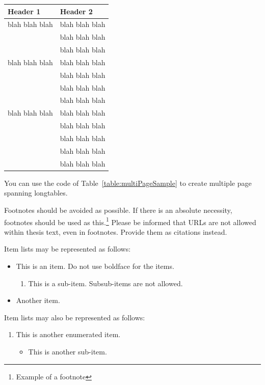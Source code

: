\documentclass[a4paper,oneside,12pt]{report}
\numberwithin{equation}{chapter}
\begin{document}
\begin{center}
\begin{longtable}{|l|l|}
		\pagebreak
		\textbf{Header 1}& \textbf{Header 2}\\\hline
		blah blah blah & blah blah blah \\
		& blah blah blah \\
		& blah blah blah \\\hline
		
		blah blah blah & blah blah blah \\
		& blah blah blah \\
		& blah blah blah \\
		& blah blah blah \\\hline
		
		blah blah blah & blah blah blah \\
		& blah blah blah \\
		& blah blah blah \\
		& blah blah blah \\
		& blah blah blah \\\hline
	\end{longtable}
\end{center}
\vskip -2cm %
\endgroup

You can use the code of Table~\ref{table:multiPageSample} to create multiple page spanning longtables.

Footnotes should be avoided as possible. If there is an absolute
necessity, footnotes should be used as this.\footnote{Example of a
footnote}  Please be informed that URLs are not allowed within thesis text, even in footnotes. Provide them as citations instead.

Item lists may be represented as follows:

\begin{itemize}
 \item This is an item. Do not use boldface for the items.
\begin{enumerate}
 \item This is a sub-item. Subsub-items are not allowed.
\end{enumerate}
\item Another item.
\end{itemize}

Item lists may also be represented as follows:
\begin{enumerate}
 \item This is another enumerated item.
\begin{itemize}
 \item This is another sub-item.
\end{itemize}

\end{enumerate}
\end{document}
